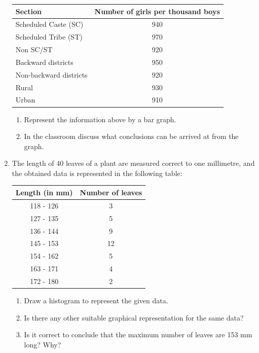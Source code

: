 \documentclass[a4paper,leqno,12pt]{amsart}
\begin{document}
\begin{enumerate}
\begin{center}
 \begin{tabular}{|l|c|}
  \hline
  \textbf{Section} & \textbf{Number of girls per thousand boys} \\
  \hline
  Scheduled Caste (SC) & 940 \\
  Scheduled Tribe (ST) & 970 \\
  Non SC/ST & 920 \\
  Backward districts & 950 \\
  Non-backward districts & 920 \\
  Rural & 930 \\
  Urban & 910 \\
  \hline
 \end{tabular}
\end{center}
\begin{enumerate}
 \item Represent the information above by a bar graph.
 \item In the classroom discuss what conclusions can be arrived at from the graph.
\end{enumerate}


\item The length of 40 leaves of a plant are measured correct to one millimetre, and the
obtained data is represented in the following table:
\begin{center}
 \begin{tabular}{|c|c|}
  \hline
  \textbf{Length (in mm)} & \textbf{Number of leaves} \\
  \hline
  118 - 126 & 3 \\
  127 - 135 & 5 \\
  136 - 144 & 9 \\
  145 - 153 & 12 \\
  154 - 162 & 5 \\
  163 - 171 & 4 \\
  172 - 180 & 2 \\ 
  \hline
 \end{tabular}
\end{center}
\begin{enumerate}
 \item Draw a histogram to represent the given data.
 \item Is there any other suitable graphical representation for the same data? 
 \item Is it correct to conclude that the maximum number of leaves are 153 mm long?
Why?
\end{enumerate}


\end{enumerate}
\end{document}
